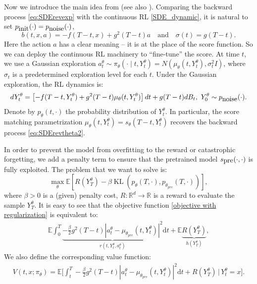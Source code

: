 \documentclass[letterpaper,11pt,reqno]{amsart}
\numberwithin{equation}{section}
\begin{document}
\quad Now we introduce the main idea from \cite{ZZT24, ZCZ25} (see also \cite{GZZ24}).
Comparing the backward process \eqref{eq:SDErevexp}
with the continuous RL \eqref{SDE_dynamic},
it is natural to set $p_{\tiny \mbox{init}}(\cdot) = p_{\tiny \mbox{noise}}(\cdot)$,
\begin{equation}
b(t,x,a)= -f(T-t, x) + g^2(T-t) a \quad \mbox{and} \quad \sigma(t) = g(T-t).
\end{equation}
Here the action $a$ has a clear meaning -- 
it is at the place of the score function. 
So we can deploy the continuous RL machinery to ``fine-tune'' the score.
At time $t$, we use a Gaussian exploration 
$a^\theta_t \sim \pi_{\theta}(\cdot\mid t,Y^\theta_t) = N(\mu_{\theta}(t,Y^\theta_t),\sigma_t^2I)$, 
where $\sigma_t$ is a predetermined exploration level for each $t$.
Under the Gaussian exploration, the RL dynamics is:
\begin{equation}
d Y_t^{\theta}=\left[-f(T-t,Y_t^{\theta}) + g^2(T-t) \mu_{\theta}(t,Y_t^{\theta})\right] dt+g(T-t) dB_t,\,\, Y^{\theta}_0\sim p_{\tiny \mbox{noise}}(\cdot).
\end{equation}
Denote by $p_\theta(t, \cdot)$ the probability distribution of $Y^\theta_t$.
In particular, the score matching parametrization $\mu_{\theta}(t, Y^\theta_t) = s_{\theta}(T-t,Y_t^{\theta})$
recovers the backward process \eqref{eq:SDErevtheta2}.

\quad In order to prevent the model from overfitting to the reward or catastrophic forgetting, 
we add a penalty term to ensure that
the pretrained model $s_{\tiny \mbox{pre}}(\cdot, \cdot)$ is fully exploited.
The problem that we want to solve is:
\begin{equation}
\label{objective with regularization}
\max_\theta \mathbb{E}\left[R(Y^{\theta}_T)-\beta \operatorname{KL}\left(p_{\theta}(T,\cdot), p_{\theta_{pre}}(T,\cdot)\right)\right],
\end{equation}
where $\beta>0$ is a (given) penalty cost,
$R: \mathbb{R}^d \to \mathbb{R}$ is a reward to evaluate the sample $Y^\theta_T$.
It is easy to see that the objective function \eqref{objective with regularization} is equivalent to:
\begin{align*}
\mathbb{E} \int_0^{T}\underbrace{-\frac{\beta}{2} g^2(T-t)|a_t^{\theta}-\mu_{\theta_{pre}}(t, Y^\theta_t)|^2}_{r (t,Y^\theta_t,a_t^{\theta})} \mathrm{d} t +\mathbb{E}\underbrace{R(Y^{\theta}_T)}_{h(Y^{\theta}_T)},
\end{align*}
We also define the corresponding value function:
\begin{align}
\label{continuous-time value function with regularization}
V(t,x; \pi_\theta)= 
\mathbb{E} \bigg[\int_t^{T}-\frac{\beta}{2} g^2(T-t)|a_t^{\theta}-\mu_{\theta_{pre}}(t, Y^\theta_t)|^2\mathrm{d} t +R(Y^{\theta}_T) \,\bigg|\, Y^{\theta}_t=x\bigg].
\end{align}
\end{document}
